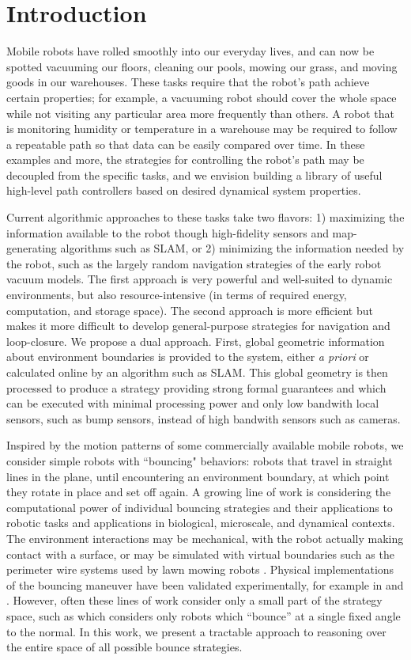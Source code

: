 \documentclass[]{styles/svproc}  %
\begin{document}
\section{Introduction}

Mobile robots have rolled smoothly into our everyday lives, and can now be
spotted vacuuming our floors, cleaning our pools, mowing our grass, and moving
goods in our warehouses. These tasks require that the robot's path achieve certain properties; for example, a 
vacuuming robot should cover the whole space while not visiting 
any particular area more frequently than others. A robot that is monitoring
humidity or temperature in a warehouse may be
required to follow a repeatable path so that data can be easily compared 
over time. In these examples and more, the strategies for controlling the robot's
path may be decoupled from the specific tasks, and we envision building a
library of useful high-level path controllers based on desired dynamical system
properties.

Current algorithmic approaches to these tasks take two flavors: 1)
maximizing the information available to the robot though high-fidelity sensors
and map-generating algorithms such as SLAM, or 2) minimizing the information needed
by the robot, such as the largely random navigation strategies of the early
robot vacuum models. The first approach is very powerful and well-suited to 
dynamic environments, but also
resource-intensive (in terms of required energy, computation, and storage
space). The second approach 
is more efficient but makes it more difficult to develop general-purpose strategies 
for navigation and loop-closure. We propose a dual
approach. First, global geometric information about environment boundaries is provided 
to the system, either \emph{a priori} or calculated online by
an algorithm such as SLAM. This global geometry is then processed to produce
a strategy providing strong formal guarantees and which can be executed with minimal 
processing power and only low bandwith local sensors, such as bump sensors,
instead of high bandwith sensors such as cameras.

Inspired by the motion patterns of some commercially available mobile robots, 
we consider simple robots with ``bouncing" behaviors: robots that
travel in straight lines in the plane, until encountering an environment
boundary, at which point they rotate in place and set off again. 
A growing line of work is considering the computational power of individual bouncing strategies
and their applications to robotic tasks and applications in biological, microscale, 
and dynamical contexts. The environment interactions may be mechanical,
with the robot actually making contact with a surface, or may be simulated with
virtual boundaries such as the perimeter wire systems used by lawn mowing robots
\cite{sahin2007household}. Physical implementations of the bouncing maneuver have
been validated experimentally, for example in \cite{LewOKa13} and
\cite{alam2018space}. However, often these lines of work consider only a small
part of the strategy space, such as \cite{ErLav13} which considers only robots
which ``bounce'' at a single fixed angle to the normal. In this work, we present 
a tractable approach to reasoning over the entire
 space of all possible bounce strategies.
\end{document}
